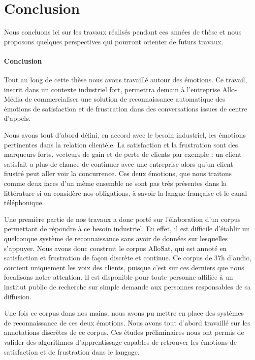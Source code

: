 \chapter*{Conclusion}

Nous concluons ici sur les travaux réalisés pendant ces années de thèse et nous proposons quelques perspectives qui pourront orienter de futurs travaux.

\subsubsection{Conclusion}
Tout au long de cette thèse nous avons travaillé autour des émotions. Ce travail, inscrit dans un contexte industriel fort, permettra demain à l'entreprise Allo-Média de commercialiser une solution de reconnaissance automatique des émotions de satisfaction et de frustration dans des conversations issues de centre d'appels.

Nous avons tout d'abord défini, en accord avec le besoin industriel, les émotions pertinentes dans la relation clientèle. La satisfaction et la frustration sont des marqueurs forts, vecteurs de gain et de perte de clients par exemple : un client satisfait a plus de chance de continuer avec une entreprise alors qu'un client frustré peut aller voir la concurrence. Ces deux émotions, que nous traitons comme deux faces d'un même ensemble ne sont pas très présentes dans la littérature si on considère nos obligations, à savoir la langue française et le canal téléphonique.

Une première partie de nos travaux a donc porté sur l'élaboration d'un corpus permettant de répondre à ce besoin industriel. En effet, il est difficile d'établir un quelconque système de reconnaissance sans avoir de données sur lesquelles s'appuyer. Nous avons donc construit le corpus AlloSat, qui est annoté en satisfaction et frustration de façon discrète et continue. Ce corpus de 37h d'audio, contient uniquement les voix des clients, puisque c'est sur ces derniers que nous focalisons notre attention. Il est disponible pour toute personne affiliée à un institut public de recherche sur simple demande aux personnes responsables de sa diffusion.

Une fois ce corpus dans nos mains, nous avons pu mettre en place des systèmes de reconnaissance de ces deux émotions. Nous avons tout d'abord travaillé sur les annotations discrètes de ce corpus. Ces études préliminaires nous ont permis de valider des algorithmes d'apprentissage capables de retrouver les émotions de satisfaction et de frustration dans le langage.


